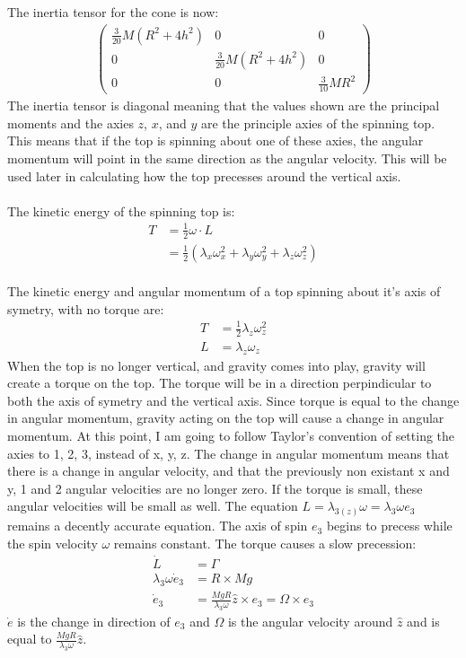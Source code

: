 \documentclass[a4paper,12pt]{article}
\begin{document}
The inertia tensor for the cone is now:
\begin{align*}
\left( \begin{array}{ccc}
\frac{3}{20}M(R^2+4h^2) & 0 & 0\\
0 & \frac{3}{20}M(R^2+4h^2) & 0\\
0 & 0 & \frac{3}{10}MR^2 \end{array} \right)
\end{align*}
The inertia tensor is diagonal meaning that the values shown are the principal moments and the axies $z$, $x$, and $y$ are the principle axies of the spinning top. This means that if the top is spinning about one of these axies, the angular momentum will point in the same direction as the angular velocity.  This will be used later in calculating how the top precesses around the vertical axis.\\
\\
The kinetic energy of the spinning top is:
\begin{align*}
T&=\frac{1}{2}\omega\cdot L\\
&=\frac{1}{2}(\lambda_x \omega_x^2+\lambda_y\omega_y^2+\lambda_z\omega_z^2)
\end{align*}
\\
The kinetic energy and angular momentum of a top spinning about it's axis of symetry, with no torque are:
\begin{align*}
T&=\frac{1}{2}\lambda_z\omega_z^2\\
L&=\lambda_z\omega_z
\end{align*}
When the top is no longer vertical, and gravity comes into play, gravity will create a torque on the top.  The torque will be in a direction perpindicular to both the axis of symetry and the vertical axis.  Since torque is equal to the change in angular momentum, gravity acting on the top will cause a change in angular momentum.  At this point, I am going to follow Taylor's convention of setting the axies to 1, 2, 3, instead of x, y, z.  The change in angular momentum means that there is a change in angular velocity, and that the previously non existant x and y, 1 and 2 angular velocities are no longer zero.  If the torque is small, these angular velocities will be small as well.  The equation $L=\lambda_{3(z)}\omega=\lambda_3\omega e_3$ remains a decently accurate equation.  The axis of spin $e_3$ begins to precess while the spin velocity $\omega$ remains constant.  The torque causes a slow precession:
\begin{align*}
\dot L&=\Gamma\\
\lambda_3\omega\dot e_3&=R\times Mg\\
\dot e_3&=\frac{MgR}{\lambda_3\omega}\hat z\times e_3=\Omega \times e_3
\end{align*}
$\dot e$ is the change in direction of $e_3$ and $\Omega$ is the angular velocity around $\hat z$ and is equal to $\frac{MgR}{\lambda_3\omega}\hat z$.
\end{document}
